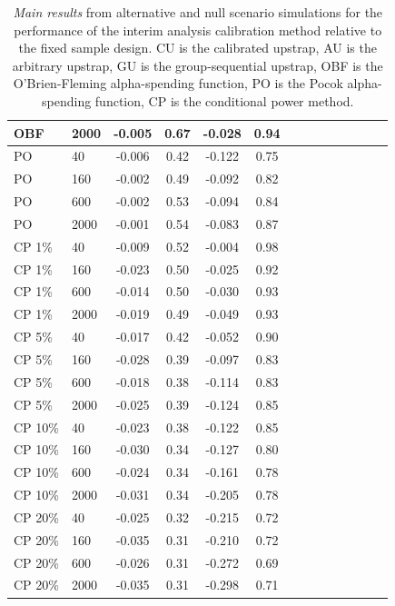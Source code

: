 \documentclass[Afour,sageh,times,square,numbers]{sagej}
\begin{document}
\begin{table}
\begin{tabular}{|l|l||C|C|C||C|C|C||C|C|C||C|C|C|}
OBF               & 2000 &   -0.005   &   0.67   &   -0.028   &   0.94   \\ \hline \hline
PO                & 40   &   -0.006   &   0.42   &   -0.122   &   0.75   \\ \hline
PO                & 160  &   -0.002   &   0.49   &   -0.092   &   0.82   \\ \hline
PO                & 600  &   -0.002   &   0.53   &   -0.094   &   0.84   \\ \hline
PO                & 2000 &   -0.001   &   0.54   &   -0.083   &   0.87   \\ \hline \hline
CP 1\%            & 40   &   -0.009   &   0.52   &   -0.004   &   0.98   \\ \hline
CP 1\%            & 160  &   -0.023   &   0.50   &   -0.025   &   0.92   \\ \hline
CP 1\%            & 600  &   -0.014   &   0.50   &   -0.030   &   0.93   \\ \hline
CP 1\%            & 2000 &   -0.019   &   0.49   &   -0.049   &   0.93   \\ \hline \hline
CP 5\%            & 40   &   -0.017   &   0.42   &   -0.052   &   0.90   \\ \hline
CP 5\%            & 160  &   -0.028   &   0.39   &   -0.097   &   0.83   \\ \hline
CP 5\%            & 600  &   -0.018   &   0.38   &   -0.114   &   0.83   \\ \hline
CP 5\%            & 2000 &   -0.025   &   0.39   &   -0.124   &   0.85   \\ \hline \hline
CP 10\%           & 40   &   -0.023   &   0.38   &   -0.122   &   0.85   \\ \hline
CP 10\%           & 160  &   -0.030   &   0.34   &   -0.127   &   0.80   \\ \hline
CP 10\%           & 600  &   -0.024   &   0.34   &   -0.161   &   0.78   \\ \hline
CP 10\%           & 2000 &   -0.031   &   0.34   &   -0.205   &   0.78   \\ \hline \hline
CP 20\%           & 40   &   -0.025   &   0.32   &   -0.215   &   0.72   \\ \hline
CP 20\%           & 160  &   -0.035   &   0.31   &   -0.210   &   0.72   \\ \hline
CP 20\%           & 600  &   -0.026   &   0.31   &   -0.272   &   0.69   \\ \hline
CP 20\%           & 2000 &   -0.035   &   0.31   &   -0.298   &   0.71   \\ \hline \end{tabular}
\caption{\textit{Main results} from alternative and null scenario simulations for the performance of the interim analysis calibration method relative to the fixed sample design. CU is the calibrated upstrap, AU is the arbitrary upstrap, GU is the group-sequential upstrap, OBF is the O'Brien-Fleming alpha-spending function, PO is the Pocok alpha-spending function, CP is the conditional power method.}
\label{tab:main}
\end{table}
\end{document}
